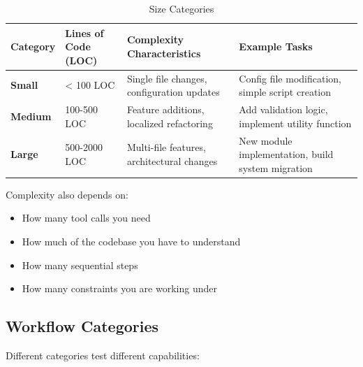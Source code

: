 \documentclass[11pt]{article}
\begin{document}
\begin{table}[htbp]
\centering
\caption{Size Categories}
\begin{tabularx}{\textwidth}{llXX}
\toprule
Category & Lines of Code (LOC) & Complexity Characteristics & Example Tasks \\
\midrule
\textbf{Small} & < 100 LOC & Single file changes, configuration updates & Config file modification, simple script creation \\
\textbf{Medium} & 100-500 LOC & Feature additions, localized refactoring & Add validation logic, implement utility function \\
\textbf{Large} & 500-2000 LOC & Multi-file features, architectural changes & New module implementation, build system migration \\
\bottomrule
\end{tabularx}
\end{table}


Complexity also depends on:
\begin{itemize}
\item How many tool calls you need
\item How much of the codebase you have to understand
\item How many sequential steps
\item How many constraints you are working under
\end{itemize}

\subsection{Workflow Categories}

Different categories test different capabilities:
\end{document}
